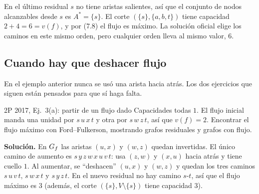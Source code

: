 \begin{center}
\hspace{1.3cm}%
\end{center}

En el último residual $s$ no tiene aristas salientes, así que el conjunto de nodos alcanzables desde $s$ es $A^*=\{s\}$. El corte $(\{s\},\{a,b,t\})$ tiene capacidad $2+4=6=v(f)$, y por (7.8) el flujo es máximo. La solución oficial elige los caminos en este mismo orden, pero cualquier orden lleva al mismo valor, $6$.

\subsection{Cuando hay que deshacer flujo}

En el ejemplo anterior nunca se usó una arista hacia atrás. Los dos ejercicios que siguen están pensados para que sí haga falta.

\begin{problema}{2P 2017, Ej.~3(a): partir de un flujo dado}
Capacidades todas $1$. El flujo inicial manda una unidad por $s\,u\,x\,t$ y otra por $s\,w\,z\,t$, así que $v(f)=2$. Encontrar el flujo máximo con Ford–Fulkerson, mostrando grafos residuales y grafos con flujo.

\smallskip
\textbf{Solución.} En $G_f$ las aristas $(u,x)$ y $(w,z)$ quedan invertidas. El único camino de aumento es $s\,y\,z\,w\,x\,u\,v\,t$: usa $(z,w)$ y $(x,u)$ hacia atrás y tiene cuello $1$. Al aumentar, se ``deshacen'' $(u,x)$ y $(w,z)$ y quedan los tres caminos $s\,u\,v\,t$, $s\,w\,x\,t$ y $s\,y\,z\,t$. En el nuevo residual no hay camino $s$-$t$, así que el flujo máximo es $3$ (además, el corte $(\{s\},V\setminus\{s\})$ tiene capacidad $3$).
\end{problema}

